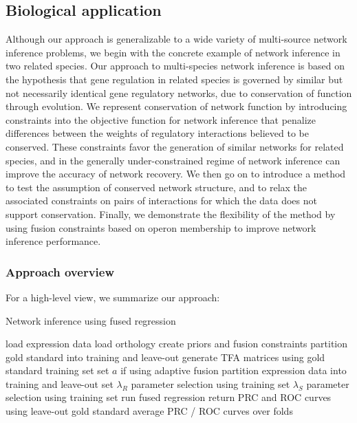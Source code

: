 \documentclass[11pt]{article}
\begin{document}
\subsection{Biological application}
Although our approach is generalizable to a wide variety of multi-source network inference problems, we begin with the concrete example of network inference in two related species. 
Our approach to multi-species network inference is based on the hypothesis that gene regulation in related species is governed by similar but not necessarily identical gene regulatory networks, due to conservation of function through evolution. 
We represent conservation of network function by introducing constraints into the objective function for network inference that penalize differences between the weights of regulatory interactions believed to be conserved. 
These constraints favor the generation of similar networks for related species, and in the generally under-constrained regime of network inference can improve the accuracy of network recovery. 
We then go on to introduce a method to test the assumption of conserved network structure, and to relax the associated constraints on pairs of interactions for which the data does not support conservation. Finally, we demonstrate the flexibility of the method by using fusion constraints based on operon membership to improve network inference performance. 


\subsubsection{Approach overview}
For a high-level view, we summarize our approach:

\begin{algorithm}
	\caption{Network inference using fused regression}\label{euclid}
	\begin{algorithmic}
\State load expression data
\State load orthology
\State create priors and fusion constraints
\State partition gold standard into training and leave-out
\State generate TFA matrices using gold standard training set 
\State set $a$ if using adaptive fusion
	\State partition expression data into training and leave-out set
	\State $\lambda_R$ parameter selection using training set
	\State $\lambda_S$ parameter selection using training set
	\State run fused regression
	\State return PRC and ROC curves using leave-out gold standard
	\EndFor
\State average PRC / ROC curves over folds
\EndProcedure
\end{algorithmic}
\end{algorithm}
\end{document}
